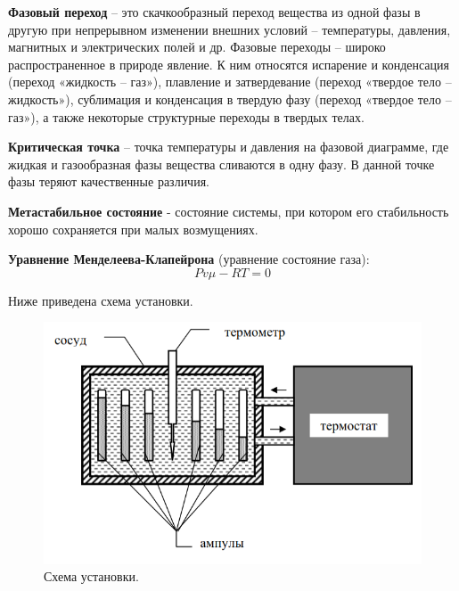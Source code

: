 \documentclass[a4paper,14pt]{article}
\begin{document}
\textbf{Фазовый переход} – это скачкообразный переход вещества из
одной фазы в другую при непрерывном изменении
внешних условий – температуры, давления, магнитных и
электрических полей и др. Фазовые переходы – широко
распространенное в природе явление. К ним относятся испарение и
конденсация (переход «жидкость – газ»), плавление и затвердевание
(переход «твердое тело – жидкость»), сублимация и конденсация в
твердую фазу (переход «твердое тело – газ»), а также некоторые
структурные переходы в твердых телах.

\textbf{Критическая точка} – точка температуры и давления на фазовой диаграмме, где жидкая и газообразная фазы вещества сливаются в одну фазу. В данной точке фазы теряют качественные различия.

\textbf{Метастабильное состояние} - состояние системы, при котором его стабильность хорошо сохраняется при малых возмущениях. 

\textbf{Уравнение Менделеева-Клапейрона} (уравнение состояние газа):
$$
    Pv\mu-RT=0
$$




Ниже приведена схема установки.

\begin{figure}[h]
    \centering
    \includegraphics[scale=0.8]{scheme.png}
    \caption{Схема установки.}
\end{figure}

\clearpage
\end{document}
